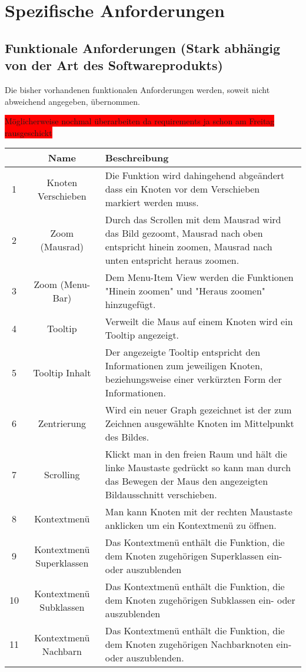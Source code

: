 \documentclass[11pt,a4paper]{article}
\begin{document}
\section{Spezifische Anforderungen} %
	\subsection{Funktionale Anforderungen (Stark abhängig von der Art des Softwareprodukts)} %
	
	Die bisher vorhandenen funktionalen Anforderungen werden, soweit nicht abweichend angegeben, übernommen.

\colorbox{red}{Möglicherweise nochmal überarbeiten da requirements ja schon am Freitag rausgeschickt}

\begin{tabular}{|c|c|p{10cm}|}
\hline 
 & Name & Beschreibung \\ 
\hline 
1 & Knoten Verschieben & Die Funktion wird dahingehend abgeändert dass ein Knoten vor dem Verschieben markiert werden muss. \\ 
\hline 
2 & Zoom (Mausrad) & Durch das Scrollen mit dem Mausrad wird das Bild gezoomt, Mausrad nach oben entspricht hinein zoomen, Mausrad nach unten entspricht heraus zoomen. \\ 
\hline 
3 & Zoom (Menu-Bar) & Dem Menu-Item View werden die Funktionen "Hinein zoomen" und "Heraus zoomen" hinzugefügt. \\ 
\hline 
4 & Tooltip & Verweilt die Maus auf einem Knoten wird ein Tooltip angezeigt. \\ 
\hline 
5 & Tooltip Inhalt & Der angezeigte Tooltip entspricht den Informationen zum jeweiligen Knoten, beziehungsweise einer verkürzten Form der Informationen. \\ 
\hline 
6 & Zentrierung & Wird ein neuer Graph gezeichnet ist der zum Zeichnen ausgewählte Knoten im Mittelpunkt des Bildes. \\ 
\hline 
7 & Scrolling & Klickt man in den freien Raum und hält die linke Maustaste gedrückt so kann man durch das Bewegen der Maus den angezeigten Bildausschnitt verschieben.  \\ 
\hline 
8 & Kontextmenü & Man kann Knoten mit der rechten Maustaste anklicken um ein Kontextmenü zu öffnen. \\ 
\hline 
9 & Kontextmenü Superklassen & Das Kontextmenü enthält die Funktion, die dem Knoten zugehörigen Superklassen ein- oder auszublenden \\ 
\hline 
10 & Kontextmenü Subklassen & Das Kontextmenü enthält die Funktion, die dem Knoten zugehörigen Subklassen ein- oder auszublenden \\ 
\hline 
11 & Kontextmenü Nachbarn & Das Kontextmenü enthält die Funktion, die dem Knoten zugehörigen Nachbarknoten ein- oder auszublenden.  \\ 
\hline 
\end{tabular} 
\end{document}
